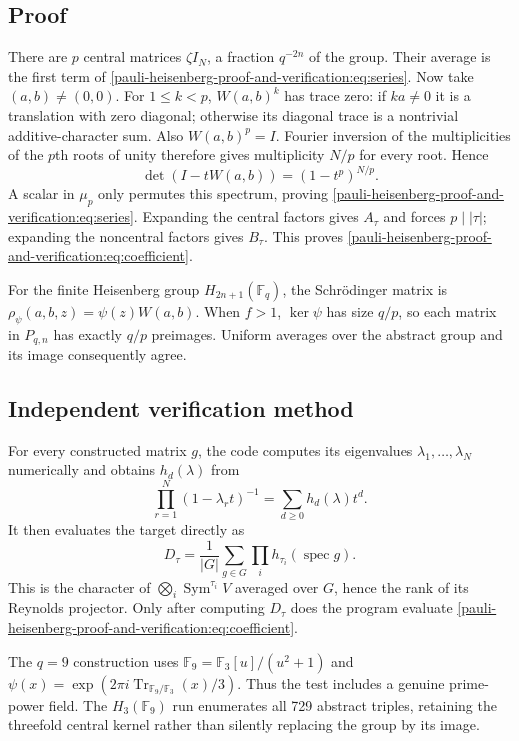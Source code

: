 \documentclass[10pt]{article}
\newcommand{\F}{\mathbb F}
\begin{document}
\subsection{Proof}
There are $p$ central matrices $\zeta I_N$, a fraction $q^{-2n}$ of the
group.  Their average is the first term of \eqref{pauli-heisenberg-proof-and-verification:eq:series}.  Now take
$(a,b)\ne(0,0)$.  For $1\le k<p$, $W(a,b)^k$ has trace zero: if $ka\ne0$
it is a translation with zero diagonal; otherwise its diagonal trace is a
nontrivial additive-character sum.  Also $W(a,b)^p=I$.  Fourier inversion of
the multiplicities of the $p$th roots of unity therefore gives multiplicity
$N/p$ for every root.  Hence
\[
\det(I-tW(a,b))=(1-t^p)^{N/p}.
\]
A scalar in $\mu_p$ only permutes this spectrum, proving \eqref{pauli-heisenberg-proof-and-verification:eq:series}.
Expanding the central factors gives $A_\tau$ and forces $p\mid|\tau|$;
expanding the noncentral factors gives $B_\tau$.  This proves
\eqref{pauli-heisenberg-proof-and-verification:eq:coefficient}.

For the finite Heisenberg group $H_{2n+1}(\F_q)$, the Schrödinger matrix is
$\rho_\psi(a,b,z)=\psi(z)W(a,b)$.  When $f>1$, $\ker\psi$ has size $q/p$,
so each matrix in $P_{q,n}$ has exactly $q/p$ preimages.  Uniform averages
over the abstract group and its image consequently agree.

\subsection{Independent verification method}
For every constructed matrix $g$, the code computes its eigenvalues
$\lambda_1,\ldots,\lambda_N$ numerically and obtains $h_d(\lambda)$ from
\[
\prod_{r=1}^N(1-\lambda_r t)^{-1}=\sum_{d\ge0}h_d(\lambda)t^d.
\]
It then evaluates the target directly as
\[
D_\tau=\frac1{|G|}\sum_{g\in G}\prod_i h_{\tau_i}(\operatorname{spec}g).
\]
This is the character of $\bigotimes_i\operatorname{Sym}^{\tau_i}V$ averaged
over $G$, hence the rank of its Reynolds projector.  Only after computing
$D_\tau$ does the program evaluate \eqref{pauli-heisenberg-proof-and-verification:eq:coefficient}.

The $q=9$ construction uses $\F_9=\F_3[u]/(u^2+1)$ and
$\psi(x)=\exp(2\pi i\operatorname{Tr}_{\F_9/\F_3}(x)/3)$.  Thus the test
includes a genuine prime-power field.  The $H_3(\F_9)$ run enumerates all
729 abstract triples, retaining the threefold central kernel rather than
silently replacing the group by its image.
\end{document}
